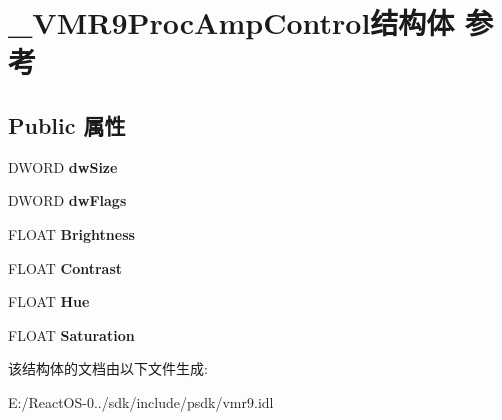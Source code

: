 \hypertarget{struct___v_m_r9_proc_amp_control}{}\section{\+\_\+\+V\+M\+R9\+Proc\+Amp\+Control结构体 参考}
\label{struct___v_m_r9_proc_amp_control}
\subsection*{Public 属性}
\begin{DoxyCompactItemize}
\item 
\mbox{\label{struct___v_m_r9_proc_amp_control_ae5d935db40ac665a53a4dfdb9f4a957b}} 
D\+W\+O\+RD {\bfseries dw\+Size}
\item 
\mbox{\label{struct___v_m_r9_proc_amp_control_aac48088dd00adead1c2416ef18919962}} 
D\+W\+O\+RD {\bfseries dw\+Flags}
\item 
\mbox{\label{struct___v_m_r9_proc_amp_control_ab00701c1fb016f2b32e10699673f2cfd}} 
F\+L\+O\+AT {\bfseries Brightness}
\item 
\mbox{\label{struct___v_m_r9_proc_amp_control_a693ccca3c07ebdcebd34da0a8e756ca0}} 
F\+L\+O\+AT {\bfseries Contrast}
\item 
\mbox{\label{struct___v_m_r9_proc_amp_control_a2d949fadd876686b4448baf5a88114d4}} 
F\+L\+O\+AT {\bfseries Hue}
\item 
\mbox{\label{struct___v_m_r9_proc_amp_control_ad6e696f7ba4355feff06c47d54592a05}} 
F\+L\+O\+AT {\bfseries Saturation}
\end{DoxyCompactItemize}


该结构体的文档由以下文件生成\+:\begin{DoxyCompactItemize}
\item 
E\+:/\+React\+O\+S-\/0../sdk/include/psdk/vmr9.\+idl\end{DoxyCompactItemize}
